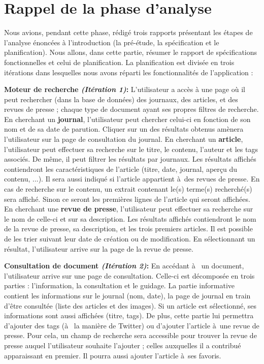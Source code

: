 \section{Rappel de la phase d'analyse}
\label{sec:rappel}

	Nous avions, pendant cette phase, rédigé trois rapports présentant les étapes de l'analyse énoncées à l'introduction (la pré-étude, la spécification et le planification). Nous allons, dans cette partie, résumer le rapport de spécifications fonctionnelles et celui de planification. La planification est  divisée en trois itérations dans lesquelles nous avons réparti les fonctionnalités de l'application : 

	\textbf{Moteur de recherche \textit{(Itération 1)}:} L'utilisateur a accès à une page où il peut rechercher (dans la base de données) des journaux, des articles, et des revues de presse ; chaque type de document ayant ses propres filtres de recherche. En cherchant un \textbf{journal}, l'utilisateur peut chercher celui-ci en fonction de son nom et de sa date de parution. Cliquer sur un des résultats obtenus amènera l'utilisateur sur la page de consultation du journal. En cherchant un \textbf{article}, l'utilisateur peut effectuer sa recherche sur le titre, le contenu, l'auteur et les tags associés. De même, il peut filtrer les résultats par journaux. Les résultats affichés contiendront les caractéristiques de l'article (titre, date, journal, aperçu du contenu, ...). Il sera aussi indiqué si l'article appartient à des revues de presse. En cas de recherche sur le contenu, un extrait contenant le(s) terme(s) recherché(s) sera affiché. Sinon ce seront les premières lignes de l'article qui seront affichées. En cherchant une \textbf{revue de presse}, l'utilisateur peut effectuer sa recherche sur le nom de celle-ci et sur sa description. Les résultats affichés contiendront le nom de la revue de presse, sa description, et les trois premiers articles. Il est possible de les trier suivant leur date de création ou de modification. En sélectionnant un résultat, l'utilisateur arrive sur la page de la revue de presse. 

	\textbf{Consultation de document \textit{(Itération 2)}:} En accédant à  un document, l'utilisateur arrive sur une page de consultation. Celle-ci est décomposée en trois parties : l'information, la consultation et le guidage. La partie informative contient les informations sur le journal (nom, date), la page de journal en train d'être consultée (liste des articles et des images). Si un article est sélectionné, ses informations sont aussi affichées (titre, tags). De plus, cette partie lui permettra d'ajouter des tags (à  la manière de Twitter) ou d'ajouter l'article à une revue de presse. Pour cela, un champ de recherche sera accessible pour trouver la revue de presse auquel l'utilisateur souhaite l'ajouter ; celles auxquelles il a contribué apparaissant en premier. Il pourra aussi ajouter l'article à ses favoris. 

